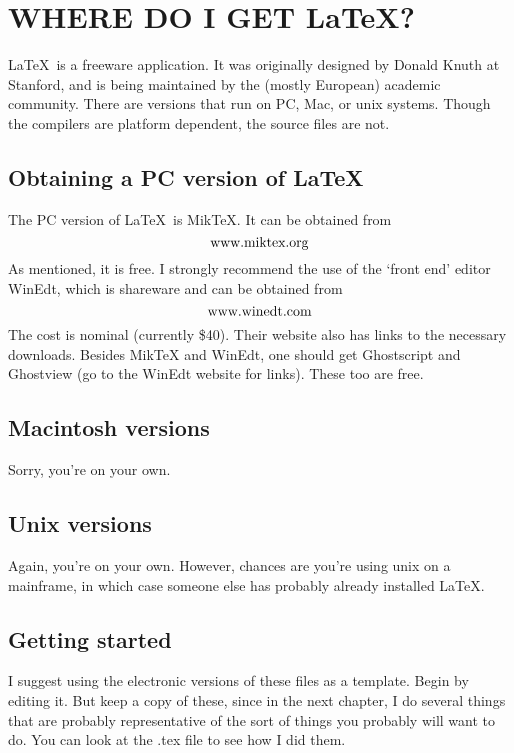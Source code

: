 \chapter{WHERE DO I GET \LaTeX?}

\LaTeX\ is a freeware application.  It was originally designed by
Donald Knuth at Stanford, and is being maintained by the (mostly
European) academic community.  There are versions that run on PC,
Mac, or unix systems.  Though the compilers are platform
dependent, the source files are not.

\section{Obtaining a PC version of \LaTeX}

The PC version of \LaTeX\ is MikTeX.  It can be obtained from
\[
\hbox{www.miktex.org}
\]
As mentioned, it is free.  I strongly recommend the use of the
`front end' editor WinEdt, which is shareware and can be obtained
from
\[
\hbox{www.winedt.com}
\]
The cost is nominal (currently \$40).  Their website also has
links to the necessary downloads.  Besides MikTeX and WinEdt, one
should get Ghostscript and Ghostview (go to the WinEdt website for
links).  These too are free.

\section{Macintosh versions}

Sorry, you're on your own.

\section{Unix versions}

Again, you're on your own.  However, chances are you're using unix
on a mainframe, in which case someone else has probably already
installed \LaTeX.

\section{Getting started}

I suggest using the electronic versions of these files as a
template.  Begin by editing it.  But keep a copy of these, since
in the next chapter, I do several things that are probably
representative of the sort of things you probably will want to do.
You can look at the .tex file to see how I did them.

